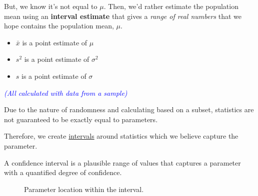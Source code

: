 \vspace{1em}

But, we know it’s not equal to $\mu$. Then, we’d rather estimate the population mean using an \textbf{interval estimate} that gives a \textit{range of real numbers} that we hope contains the population mean, $\mu$.
\vspace{1em}
\begin{example}

\begin{itemize}
    \item $\bar{x}$ is a point estimate of $\mu$
    \item $s^2$ is a point estimate of $\sigma^2$
    \item $s$ is a point estimate of $\sigma$
\end{itemize}

\vspace{0.5em}
\textcolor{blue}{\textit{(All calculated with data from a sample)}}

\end{example}

Due to the nature of randomness and calculating based on a subset, statistics are not guaranteed to be exactly equal to parameters.

\vspace{1em}

Therefore, we create \underline{intervals} around statistics which we believe capture the parameter.

\vspace{0.5em}

\noindent
\begin{definition}
A confidence interval is a plausible range of values that captures a parameter with a quantified degree of confidence.
\end{definition}



\vspace{1em}

\begin{figure}[h]
\centering
{}
\vspace{-0.5em} %
\caption{Parameter location within the interval.}
\end{figure}

